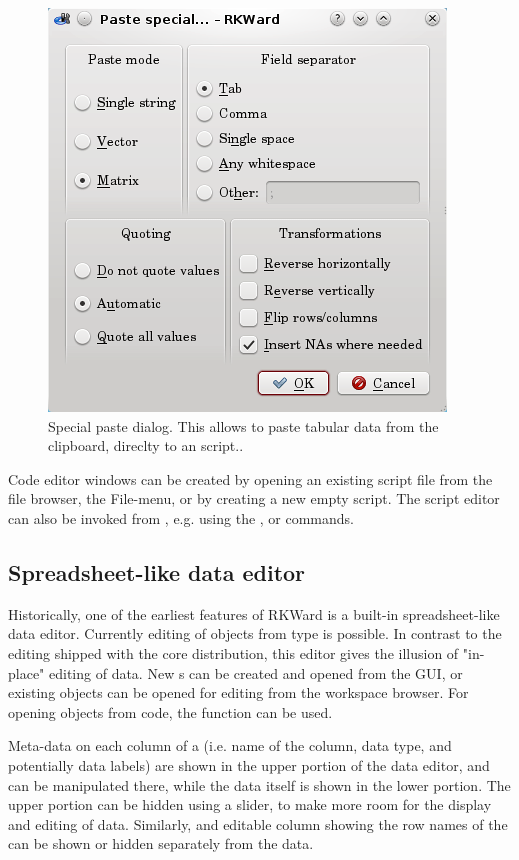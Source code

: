 \begin{figure}[htp]
 \centering
 \includegraphics{../figures/special_paste.png}
 \caption{Special paste dialog. This allows to paste tabular data from the clipboard, direclty to an  script..}
 \label{fig:special_paste}
\end{figure}

Code editor windows can be created by opening an existing
 script file from the file browser, the
File-menu, or by creating a new empty script. The script editor can
also be invoked from , e.g. using the
,  or 
commands.

\subsection{Spreadsheet-like data editor}
\label{sec:spreadsheet}

Historically, one of the earliest
features of RKWard is a built-in spreadsheet-like data editor.
Currently editing of  objects from type
 is possible. In contrast to the  editing shipped
with the  core distribution, this editor
gives the illusion of "in-place" editing of data. New s can
be created and opened from the GUI, or existing objects can be opened
for editing from the workspace browser. For opening objects from
 code, the function
 can be used.

Meta-data on each column of a  (i.e. name of the column, data
type, and potentially data labels) are shown in the upper portion of
the data editor, and can be manipulated there, while the data itself is
shown in the lower portion. The upper portion can be hidden using a
slider, to make more room for the display and editing of data.
Similarly, and editable column showing the row names of the 
can be shown or hidden separately from the data.

